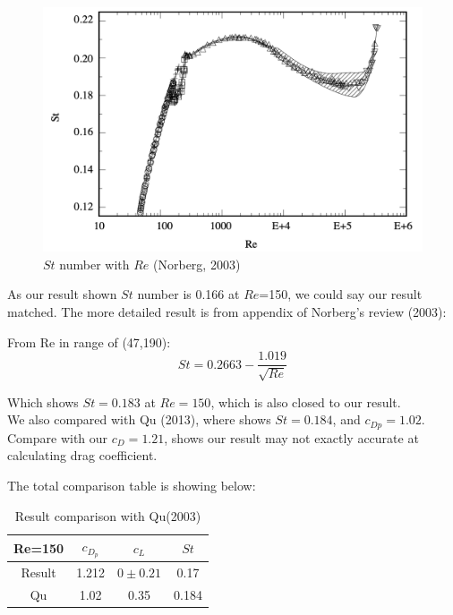 \documentclass[12pt]{article}
\begin{document}
\begin{figure}[H]
    \centering
    \includegraphics[width=0.6\linewidth]{figure/Literature/Lit-Re_St.jpg}
    \caption{$St$ number with $Re$ (Norberg, 2003\cite{NORBERG200357})}
\end{figure}

As our result shown $St$ number is 0.166 at $Re$=150, we could say our result matched. The more detailed result is from appendix of Norberg's review (2003)\cite{NORBERG200357}:

From Re in range of (47,190):
$$
St = 0.2663 - \frac{1.019}{\sqrt{Re}}
$$

Which shows $St = 0.183$ at $Re=150$, which is also closed to our result.\\



We also compared with Qu (2013)\cite{QU2013347}, where shows $St=0.184$, and $c_{Dp}=1.02$. Compare with our $c_D=1.21$, shows our result may not exactly accurate at calculating drag coefficient.


The total comparison table is showing below:
\begin{table}[ht]
\centering
\caption{Result comparison with Qu(2003)\cite{QU2013347}}
\begin{tabular}{c|ccc}
\toprule
Re=150 & $c_{D_p}$ & $c_L$ & $St$ \\
\midrule
Result & 1.212 & $0 \pm 0.21$ & 0.17 \\
Qu\cite{QU2013347} & 1.02 & 0.35 & 0.184 \\
\bottomrule
\end{tabular}
\end{table}
\end{document}
